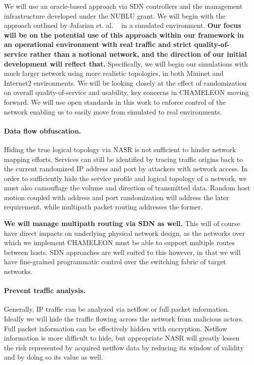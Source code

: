 \documentclass{sbir}
\begin{document}
We will use an oracle-based approach via SDN controllers and the management infrastructure developed under the NUBLU grant.  We will begin with the approach outlined by Jafarian et. al. ~\cite{JaAlDu:12} in a simulated environment. {\bf Our focus will be on the potential use of this approach within our framework in an operational environment with real traffic and strict quality-of-service rather than a notional network, and the direction of our initial development will reflect that.} Specifically, we will begin our simulations with much larger network using more realistic topologies, in both Mininet and Internet2 environments. We will be looking closely at the effect of randomization on overall quality-of-service and usability, key concerns in CHAMELEON moving forward. We will use open standards in this work to enforce control of the network enabling us to easily move from simulated to real environments.

\paragraph{Data flow obfuscation.}
Hiding the true logical topology via NASR is not sufficient to hinder network mapping efforts. Services can still be identified by tracing traffic origins back to the current randomized IP address and port by attackers with network access. In order to sufficiently hide the service profile and logical topology of a network, we must also camouflage the volume and direction of transmitted data. Random host motion coupled with address and port randomization will address the later requirement, while multipath packet routing addresses the former.

{\bf We will manage multipath routing via SDN as well.} This will of course have direct impacts on underlying physical network design, as the networks over which we implement CHAMELEON must be able to support multiple routes between hosts.  SDN approaches are well suited to this however, in that we will have fine-grained programmatic control over the switching fabric of target networks.

\paragraph{Prevent traffic analysis.}
Generally, IP traffic can be analyzed via netflow or full packet information.  Ideally we will hide the traffic flowing across the network from malicious actors.  Full packet information can be effectively hidden with encryption.  Netflow information is more difficult to hide, but appropriate NASR will greatly lessen the risk represented by acquired netflow data by reducing its window of validity and by doing so its value as well.
\end{document}

